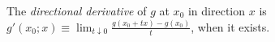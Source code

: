 The \emph{directional derivative} of $g$ at $x_0$ in direction $x$ is $g'(x_0;x)\equiv\lim_{t\downarrow0}\frac{g(x_0+tx)-g(x_0)}{t}$, when it exists.

